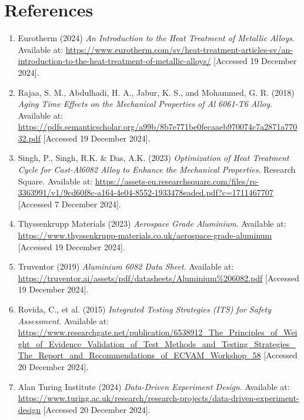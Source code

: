 \documentclass{article}
\begin{document}
{    
    
    \newpage\vspace*{-30pt}

\section{References}
\begin{enumerate}
    \item Eurotherm (2024) \textit{An Introduction to the Heat Treatment of Metallic Alloys}. Available at: \url{https://www.eurotherm.com/sv/heat-treatment-articles-sv/an-introduction-to-the-heat-treatment-of-metallic-alloys/} [Accessed 19 December 2024].
    
    \item Rajaa, S. M., Abdulhadi, H. A., Jabur, K. S., and Mohammed, G. R. (2018) \textit{Aging Time Effects on the Mechanical Properties of Al 6061-T6 Alloy}. Available at: \url{https://pdfs.semanticscholar.org/a99b/8b7e771be0fecaaeb970074c7a2871a77032.pdf} [Accessed 19 December 2024].        
    
    \item Singh, P., Singh, R.K. \& Das, A.K. (2023) \textit{Optimization of Heat Treatment Cycle for Cast-Al6082 Alloy to Enhance the Mechanical Properties}. Research Square. Available at: \url{https://assets-eu.researchsquare.com/files/rs-3363991/v1/9cd60f8c-a164-4e04-8552-1933478eaded.pdf?c=1711467707} [Accessed 7 December 2024].
    
    \item Thyssenkrupp Materials (2023) \textit{Aerospace Grade Aluminium}. Available at: \url{https://www.thyssenkrupp-materials.co.uk/aerospace-grade-aluminum} [Accessed 19 December 2024].
    
    \item Truventor (2019) \textit{Aluminium 6082 Data Sheet}. Available at: \url{https://truventor.ai/assets/pdf/datasheets/Aluminium\%206082.pdf} [Accessed 19 December 2024].
    
    \item Rovida, C., et al. (2015) \textit{Integrated Testing Strategies (ITS) for Safety Assessment}. Available at: \url{https://www.researchgate.net/publication/6538912_The_Principles_of_Weight_of_Evidence_Validation_of_Test_Methods_and_Testing_Strategies_The_Report_and_Recommendations_of_ECVAM_Workshop_58} [Accessed 20 December 2024].
    
    \item Alan Turing Institute (2024) \textit{Data-Driven Experiment Design}. Available at: \url{https://www.turing.ac.uk/research/research-projects/data-driven-experiment-design} [Accessed 20 December 2024].
    

\end{enumerate}}
\end{document}

